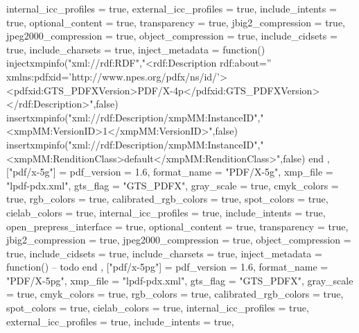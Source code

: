 {{            internal_icc_profiles   = true,
            external_icc_profiles   = true,
            include_intents         = true,
            optional_content        = true,
            transparency            = true,
            jbig2_compression       = true,
            jpeg2000_compression    = true,
            object_compression      = true,
            include_cidsets         = true,
            include_charsets        = true,
            inject_metadata         = function()
                injectxmpinfo("xml://rdf:RDF","<rdf:Description rdf:about='' xmlns:pdfxid='http://www.npes.org/pdfx/ns/id/'><pdfxid:GTS_PDFXVersion>PDF/X-4p</pdfxid:GTS_PDFXVersion></rdf:Description>",false)
                insertxmpinfo("xml://rdf:Description/xmpMM:InstanceID","<xmpMM:VersionID>1</xmpMM:VersionID>",false)
                insertxmpinfo("xml://rdf:Description/xmpMM:InstanceID","<xmpMM:RenditionClass>default</xmpMM:RenditionClass>",false)
            end
        },
        ["pdf/x-5g"] = {
            pdf_version             = 1.6,
            format_name             = "PDF/X-5g",
            xmp_file                = "lpdf-pdx.xml",
            gts_flag                = "GTS_PDFX",
            gray_scale              = true,
            cmyk_colors             = true,
            rgb_colors              = true,
            calibrated_rgb_colors   = true,
            spot_colors             = true,
            cielab_colors           = true,
            internal_icc_profiles   = true,
            include_intents         = true,
            open_prepress_interface = true,
            optional_content        = true,
            transparency            = true,
            jbig2_compression       = true,
            jpeg2000_compression    = true,
            object_compression      = true,
            include_cidsets         = true,
            include_charsets        = true,
            inject_metadata         = function()
                -- todo
            end
        },
        ["pdf/x-5pg"] = {
            pdf_version             = 1.6,
            format_name             = "PDF/X-5pg",
            xmp_file                = "lpdf-pdx.xml",
            gts_flag                = "GTS_PDFX",
            gray_scale              = true,
            cmyk_colors             = true,
            rgb_colors              = true,
            calibrated_rgb_colors   = true,
            spot_colors             = true,
            cielab_colors           = true,
            internal_icc_profiles   = true,
            external_icc_profiles   = true,
            include_intents         = true,
}}
